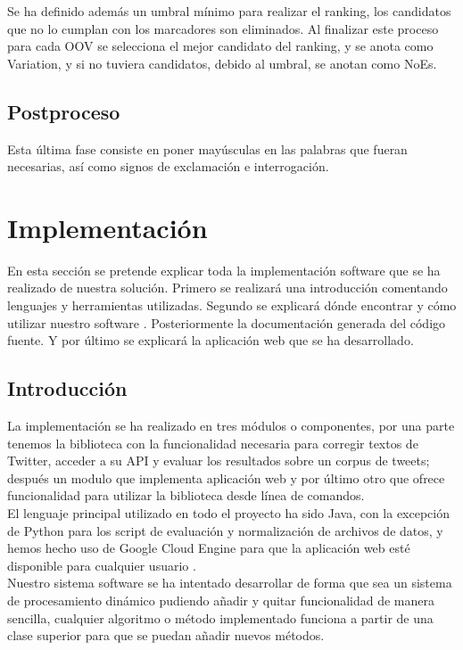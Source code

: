 \documentclass[spanish,12pt, a4paper,twoside]{paper}
\let\oldsection\section
\def\section{\cleardoublepage\oldsection}
\begin{document}
Se ha definido además un umbral mínimo para realizar el ranking, los candidatos que no lo cumplan con los marcadores son eliminados. Al finalizar este proceso para cada OOV se selecciona el mejor candidato del ranking, y se anota como Variation, y si no tuviera candidatos, debido al umbral, se anotan como NoEs.

\subsection{Postproceso}\label{sec:postproceso}
Esta última fase consiste en poner mayúsculas en las palabras que fueran necesarias, así como signos de exclamación e interrogación.

\section{Implementación}\label{sec:implementacion}
En esta sección se pretende explicar toda la implementación software que se ha realizado de nuestra solución. Primero se realizará una introducción comentando lenguajes y herramientas utilizadas. Segundo se explicará dónde encontrar y cómo utilizar nuestro software . Posteriormente la documentación generada del código fuente. Y por último se explicará la aplicación web que se ha desarrollado.

\subsection{Introducción}\label{sec:introduccion}
La implementación se ha realizado en tres módulos o componentes, por una parte tenemos la biblioteca con la funcionalidad necesaria para corregir textos de Twitter, acceder a su API y evaluar los resultados sobre un corpus de tweets; después un modulo que implementa aplicación web y por último otro que ofrece funcionalidad para utilizar la biblioteca desde línea de comandos.\\

El lenguaje principal utilizado en todo el proyecto ha sido Java, con la excepción de Python para los script de evaluación y normalización de archivos de datos, y hemos hecho uso de Google Cloud Engine \cite{googlecloudengine} para que la aplicación web esté disponible para cualquier usuario \cite{tweetscweb:spellchecker}.\\

Nuestro sistema software se ha intentado desarrollar de forma que sea un sistema de procesamiento dinámico pudiendo añadir y quitar funcionalidad de manera sencilla, cualquier algoritmo o método implementado funciona a partir de una clase superior para que se puedan añadir nuevos métodos.\\
\end{document}
